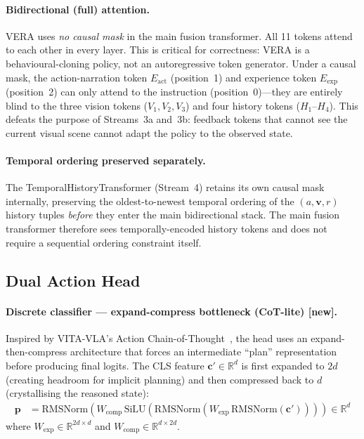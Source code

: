 \documentclass{article}
\newcommand{\NEW}{\textcolor{NewOrange}{\textbf{[new]}}\xspace}
\begin{document}
\paragraph{Bidirectional (full) attention.}
VERA uses \emph{no causal mask} in the main fusion transformer.
All 11 tokens attend to each other in every layer.
This is critical for correctness: VERA is a behavioural-cloning policy, not
an autoregressive token generator.
Under a causal mask, the action-narration token $E_{\mathrm{act}}$ (position~1) and
experience token $E_{\mathrm{exp}}$ (position~2) can only attend to the instruction
(position~0)---they are entirely blind to the three vision tokens ($V_1, V_2, V_3$)
and four history tokens ($H_1$--$H_4$).
This defeats the purpose of Streams~3a and~3b: feedback tokens that cannot
see the current visual scene cannot adapt the policy to the observed state.

\paragraph{Temporal ordering preserved separately.}
The TemporalHistoryTransformer (Stream~4) retains its own causal mask
internally, preserving the oldest-to-newest temporal ordering of the
$(a, \mathbf{v}, r)$ history tuples \emph{before} they enter the main
bidirectional stack.
The main fusion transformer therefore sees temporally-encoded history tokens
and does not require a sequential ordering constraint itself.

\subsection{Dual Action Head}

\paragraph{Discrete classifier — expand-compress bottleneck (CoT-lite) \NEW.}
Inspired by VITA-VLA's Action Chain-of-Thought~\citep{vitavla2024},
the head uses an expand-then-compress architecture that forces an
intermediate ``plan'' representation before producing final logits.
The CLS feature $\mathbf{c}'\!\in\!\mathbb{R}^d$ is first expanded to $2d$
(creating headroom for implicit planning) and then compressed back to $d$
(crystallising the reasoned state):
\begin{align}
  \mathbf{p} &= \mathrm{RMSNorm}\!\left(
    W_{\mathrm{comp}}\,\mathrm{SiLU}\!\left(
      \mathrm{RMSNorm}\!\left(
        W_{\mathrm{exp}}\,\mathrm{RMSNorm}(\mathbf{c}')
      \right)
    \right)
  \right) \in\mathbb{R}^d
  \label{eq:bottleneck}
\end{align}
where $W_{\mathrm{exp}}\!\in\!\mathbb{R}^{2d\times d}$ and
$W_{\mathrm{comp}}\!\in\!\mathbb{R}^{d\times 2d}$.
\end{document}
